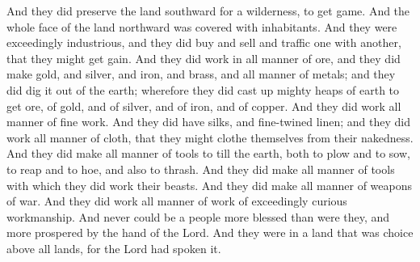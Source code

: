 And they did preserve the land southward for a wilderness, to get game. And the whole face of the land northward was covered with inhabitants.
\bverse \iffalse And they were exceedingly industrious, and they did buy and sell and traffic one with another, that they might get gain. \fi
And they were exceedingly industrious, and they did buy and sell and traffic one with another, that they might get gain.
\bverse \iffalse And they did work in all manner of ore, and they did make gold, and silver, and iron, and brass, and all manner of metals; and they did dig it out of the earth; wherefore they did cast up mighty heaps of earth to get ore, of gold, and of silver, and of iron, and of copper. And they did work all manner of fine work. \fi
And they did work in all manner of ore, and they did make gold, and silver, and iron, and brass, and all manner of metals; and they did dig it out of the earth; wherefore they did cast up mighty heaps of earth to get ore, of gold, and of silver, and of iron, and of copper. And they did work all manner of fine work.
\bverse \iffalse And they did have silks, and fine-twined linen; and they did work all manner of cloth, that they might clothe themselves from their nakedness. \fi
And they did have silks, and fine-twined linen; and they did work all manner of cloth, that they might clothe themselves from their nakedness.
\bverse \iffalse And they did make all manner of tools to till the earth, both to plow and to sow, to reap and to hoe, and also to thrash. \fi
And they did make all manner of tools to till the earth, both to plow and to sow, to reap and to hoe, and also to thrash.
\bverse \iffalse And they did make all manner of tools with which they did work their beasts. \fi
And they did make all manner of tools with which they did work their beasts.
\bverse \iffalse And they did make all manner of weapons of war. And they did work all manner of work of exceedingly curious workmanship. \fi
And they did make all manner of weapons of war. And they did work all manner of work of exceedingly curious workmanship.
\bverse \iffalse And never could be a people more blessed than were they, and more prospered by the hand of the Lord. And they were in a land that was choice above all lands, for the Lord had spoken it. \fi
And never could be a people more blessed than were they, and more prospered by the hand of the Lord. And they were in a land that was choice above all lands, for the Lord had spoken it.
\bverse \iffalse And it came to pass that Lib did live many years, and begat sons and daughters; and he also begat Hearthom. \fi

